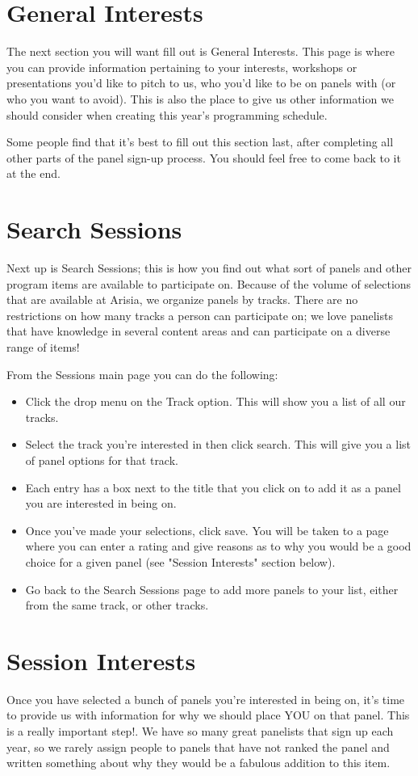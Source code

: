 \documentclass[captions=tablesignature]{scrartcl}
\begin{document}
\section{General Interests}
\label{sec-4}
The next section you will want fill out is General Interests. This
page is where you can provide information pertaining to your
interests, workshops or presentations you’d like to pitch to us, who
you’d like to be on panels with (or who you want to avoid).  This is
also the place to give us other information we should consider when
creating this year’s programming schedule.

Some people find that it’s best to fill out this section last, after
completing all other parts of the panel sign-up process.  You should
feel free to come back to it at the end.

\section{Search Sessions}
\label{sec-5}
Next up is Search Sessions; this is how you find out what sort of
panels and other program items are available to participate
on. Because of the volume of selections that are available at
Arisia, we organize panels by tracks. There are no restrictions on
how many tracks a person can participate on; we love panelists that
have knowledge in several content areas and can participate on a
diverse range of items!

From the Sessions main page you can do the following:
\begin{itemize}
\item Click the drop menu on the Track option. This will show you a list
of all our tracks.
\item Select the track you’re interested in then click search. This will
give you a list of panel options for that track.
\item Each entry has a box next to the title that you click on to add it
as a panel you are interested in being on.
\item Once you’ve made your selections, click save. You will be taken to
a page where you can enter a rating and give reasons as to why you
would be a good choice for a given panel (see "Session Interests"
section below).
\item Go back to the Search Sessions page to add more panels to your
list, either from the same track, or other tracks.
\end{itemize}

\section{Session Interests}
\label{sec-6}
Once you have selected a bunch of panels you’re interested in being
on, it’s time to provide us with information for why we should place
YOU on that panel.  This is a really important step!.  We have so
many great panelists that sign up each year, so we rarely assign
people to panels that have not ranked the panel and written
something about why they would be a fabulous addition to this item.
\end{document}
